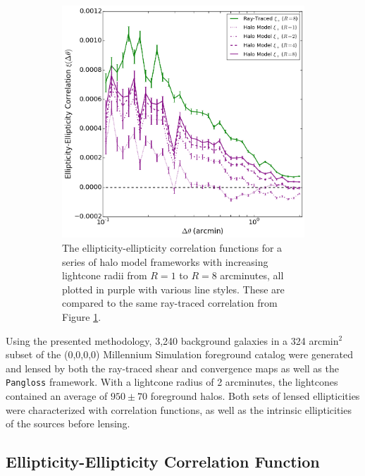 \documentclass[%
 reprint,
 amsmath,amssymb,
 aps,nofootinbib
]{revtex4-1}
\begin{document}
\begin{figure}
\begin{subfigure}{0.475\textwidth}
        \label{gg_corr}
    \end{subfigure}
    ~~
    \begin{subfigure}{0.475\textwidth}
        \includegraphics[width=\textwidth]{figs-swe/gg_corr_series.png}
        \captionsetup{justification=raggedright,singlelinecheck=false}
        \caption{The ellipticity-ellipticity correlation functions for a series of halo model frameworks with increasing lightcone radii from $R=1$ to $R=8$ arcminutes, all plotted in purple with various line styles. These are compared to the same ray-traced correlation from Figure \ref{gg_corr}.}
        \label{gg_corr_series}
    \end{subfigure}
    \caption{}
\end{figure}

Using the presented methodology, 3,240 background galaxies in a 324 arcmin$^2$ subset of the (0,0,0,0) Millennium Simulation foreground catalog were generated and lensed by both the ray-traced shear and convergence maps as well as the \texttt{Pangloss} framework. With a lightcone radius of 2 arcminutes, the lightcones contained an average of ${950\pm70}$ foreground halos. Both sets of lensed ellipticities were characterized with correlation functions, as well as the intrinsic ellipticities of the sources before lensing.

\subsection*{Ellipticity-Ellipticity Correlation Function}
\end{document}
